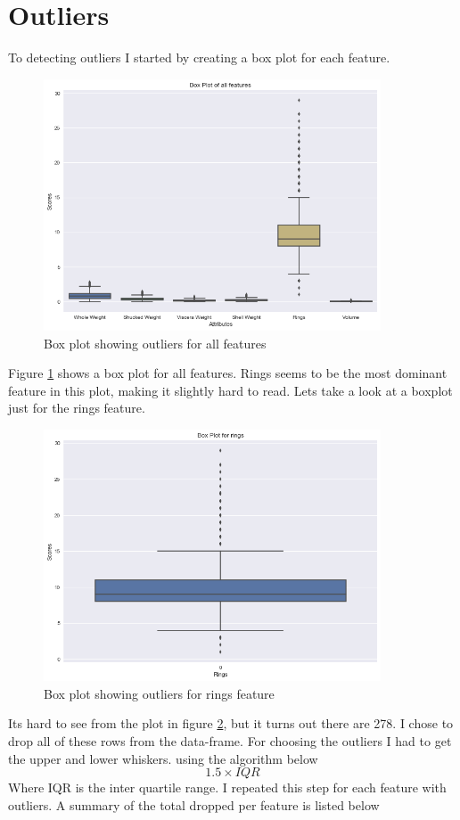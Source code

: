\section{Outliers}

To detecting outliers I started by creating a box plot for each feature.
\begin{figure}[H]
  \centering
  \includegraphics[scale=0.5,width=100mm]{./images/abalone-outlier-1.png}
  \caption{Box plot showing outliers for all features}
  \label{fig:abalone-outlier-1}
\end{figure}
Figure \ref{fig:abalone-outlier-1} shows a box plot for all features. Rings seems to be the most dominant feature in this plot, making it slightly hard to read. Lets take a look at a boxplot just for the rings feature.
\begin{figure}[H]
  \centering
  \includegraphics[scale=0.5,width=100mm]{./images/abalone-outlier-rings.png}
  \caption{Box plot showing outliers for rings feature}
  \label{fig:abalone-outlier-rings}
\end{figure}
Its hard to see from the plot in figure \ref{fig:abalone-outlier-rings}, but it turns out there are 278. I chose to drop all of these rows from the data-frame. For choosing the outliers I had to get the upper and lower whiskers. using the algorithm below
\begin{equation}
    1.5 \times IQR
\end{equation}
Where IQR is the inter quartile range. I repeated this step for each feature with outliers. A summary of the total dropped per feature is listed below

